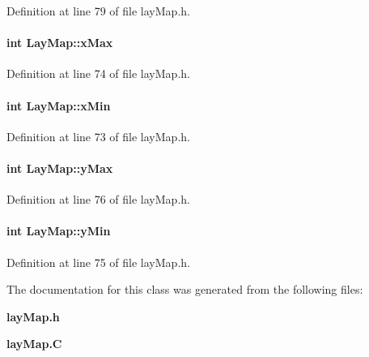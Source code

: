 Definition at line 79 of file lay\-Map.h.\label{LayMap_o1}
\paragraph{\setlength{\rightskip}{0pt plus 5cm}int Lay\-Map::x\-Max\hspace{0.3cm}{\tt  [private]}}\hfill



Definition at line 74 of file lay\-Map.h.\label{LayMap_o0}
\paragraph{\setlength{\rightskip}{0pt plus 5cm}int Lay\-Map::x\-Min\hspace{0.3cm}{\tt  [private]}}\hfill



Definition at line 73 of file lay\-Map.h.\label{LayMap_o3}
\paragraph{\setlength{\rightskip}{0pt plus 5cm}int Lay\-Map::y\-Max\hspace{0.3cm}{\tt  [private]}}\hfill



Definition at line 76 of file lay\-Map.h.\label{LayMap_o2}
\paragraph{\setlength{\rightskip}{0pt plus 5cm}int Lay\-Map::y\-Min\hspace{0.3cm}{\tt  [private]}}\hfill



Definition at line 75 of file lay\-Map.h.

The documentation for this class was generated from the following files:\begin{CompactItemize}
\item 
{\bf lay\-Map.h}\item 
{\bf lay\-Map.C}\end{CompactItemize}
